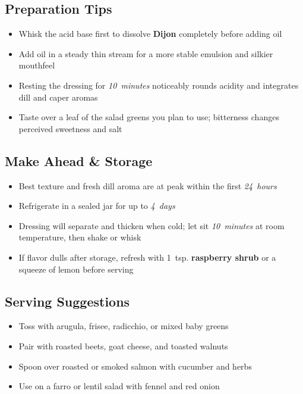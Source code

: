\documentclass[11pt,letterpaper]{article}
\begin{document}
\subsection*{Preparation Tips}
\begin{itemize}
    \item Whisk the acid base first to dissolve \textbf{Dijon} completely before adding oil
    \item Add oil in a steady thin stream for a more stable emulsion and silkier mouthfeel
    \item Resting the dressing for \textit{10~minutes} noticeably rounds acidity and integrates dill and caper aromas
    \item Taste over a leaf of the salad greens you plan to use; bitterness changes perceived sweetness and salt
\end{itemize}

\subsection*{Make Ahead \& Storage}
\begin{itemize}
    \item Best texture and fresh dill aroma are at peak within the first \textit{24~hours}
    \item Refrigerate in a sealed jar for up to \textit{4~days}
    \item Dressing will separate and thicken when cold; let sit \textit{10~minutes} at room temperature, then shake or whisk
    \item If flavor dulls after storage, refresh with 1~tsp. \textbf{raspberry shrub} or a squeeze of lemon before serving
\end{itemize}

\subsection*{Serving Suggestions}
\begin{itemize}
    \item Toss with arugula, frisee, radicchio, or mixed baby greens
    \item Pair with roasted beets, goat cheese, and toasted walnuts
    \item Spoon over roasted or smoked salmon with cucumber and herbs
    \item Use on a farro or lentil salad with fennel and red onion
\end{itemize}
\end{document}
